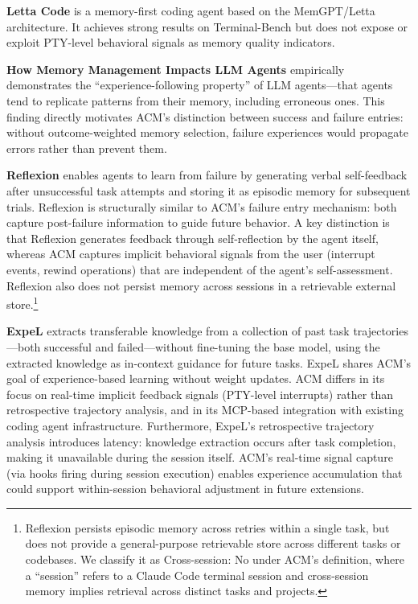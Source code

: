 \documentclass[conference]{IEEEtran}
\begin{document}
\textbf{Letta Code} \cite{LettaCode2025} is a memory-first coding agent based on the MemGPT/Letta architecture. It achieves strong results on Terminal-Bench but does not expose or exploit PTY-level behavioral signals as memory quality indicators.

\textbf{How Memory Management Impacts LLM Agents} \cite{Xiong2025MemoryMgmt} empirically demonstrates the ``experience-following property'' of LLM agents---that agents tend to replicate patterns from their memory, including erroneous ones. This finding directly motivates ACM's distinction between success and failure entries: without outcome-weighted memory selection, failure experiences would propagate errors rather than prevent them.

\textbf{Reflexion} \cite{Shinn2023Reflexion} enables agents to learn from failure by generating verbal self-feedback after unsuccessful task attempts and storing it as episodic memory for subsequent trials. Reflexion is structurally similar to ACM's failure entry mechanism: both capture post-failure information to guide future behavior. A key distinction is that Reflexion generates feedback through self-reflection by the agent itself, whereas ACM captures implicit behavioral signals from the user (interrupt events, rewind operations) that are independent of the agent's self-assessment. Reflexion also does not persist memory across sessions in a retrievable external store.\footnote{Reflexion persists episodic memory across retries within a single task, but does not provide a general-purpose retrievable store across different tasks or codebases. We classify it as Cross-session: No under ACM's definition, where a ``session'' refers to a Claude Code terminal session and cross-session memory implies retrieval across distinct tasks and projects.}

\textbf{ExpeL} \cite{Zhao2023ExpeL} extracts transferable knowledge from a collection of past task trajectories---both successful and failed---without fine-tuning the base model, using the extracted knowledge as in-context guidance for future tasks. ExpeL shares ACM's goal of experience-based learning without weight updates. ACM differs in its focus on real-time implicit feedback signals (PTY-level interrupts) rather than retrospective trajectory analysis, and in its MCP-based integration with existing coding agent infrastructure. Furthermore, ExpeL's retrospective trajectory analysis introduces latency: knowledge extraction occurs after task completion, making it unavailable during the session itself. ACM's real-time signal capture (via hooks firing during session execution) enables experience accumulation that could support within-session behavioral adjustment in future extensions.
\end{document}
